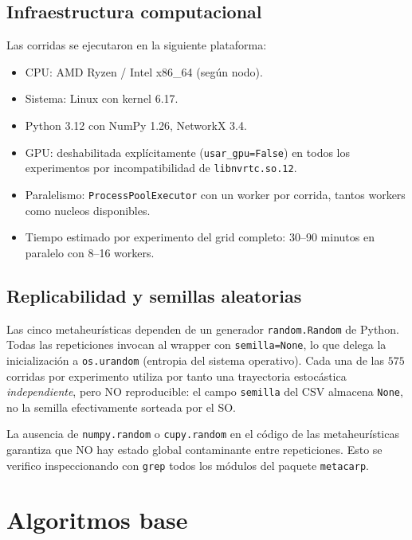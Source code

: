 \subsection{Infraestructura computacional}
\label{sec:infra}

Las corridas se ejecutaron en la siguiente plataforma:
\begin{itemize}
\item CPU: AMD Ryzen / Intel x86\_64 (según nodo).
\item Sistema: Linux con kernel 6.17.
\item Python 3.12 con NumPy 1.26, NetworkX 3.4.
\item GPU: deshabilitada explícitamente (\texttt{usar\_gpu=False}) en
  todos los experimentos por incompatibilidad de \texttt{libnvrtc.so.12}.
\item Paralelismo: \texttt{ProcessPoolExecutor} con un worker por
  corrida, tantos workers como nucleos disponibles.
\item Tiempo estimado por experimento del grid completo: 30--90
  minutos en paralelo con 8--16 workers.
\end{itemize}

\subsection{Replicabilidad y semillas aleatorias}
\label{sec:semillas}

Las cinco metaheurísticas dependen de un generador \texttt{random.Random}
de Python. Todas las repeticiones invocan al wrapper con
\texttt{semilla=None}, lo que delega la inicialización a
\texttt{os.urandom} (entropia del sistema operativo). Cada una de las
$575$ corridas por experimento utiliza por tanto una trayectoria
estocástica \emph{independiente}, pero NO reproducible: el campo
\texttt{semilla} del CSV almacena \texttt{None}, no la semilla
efectivamente sorteada por el SO.

La ausencia de \texttt{numpy.random} o \texttt{cupy.random} en el
código de las metaheurísticas garantiza que NO hay estado global
contaminante entre repeticiones. Esto se verifico inspeccionando con
\texttt{grep} todos los módulos del paquete \texttt{metacarp}.

\section{Algoritmos base}
\label{sec:algoritmos-base}


